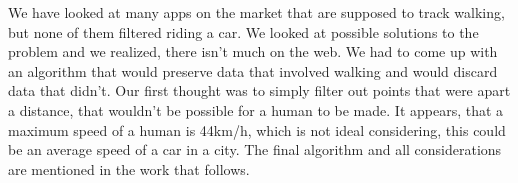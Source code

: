 We have looked at many apps on the market that are supposed to track walking, but none of them filtered riding a car. We looked at possible solutions to the problem and we realized, there isn’t much on the web. We had to come up with an algorithm that would preserve data that involved walking and would discard data that didn’t. Our first thought was to simply filter out points that were apart a distance, that wouldn’t be possible for a human to be made. It appears, that a maximum speed of a human is 44km/h\cite{GuinessWorldRecordsHumanSpeed}, which is not ideal considering, this could be an average speed of a car in a city. The final algorithm and all considerations are mentioned in the work that follows.

